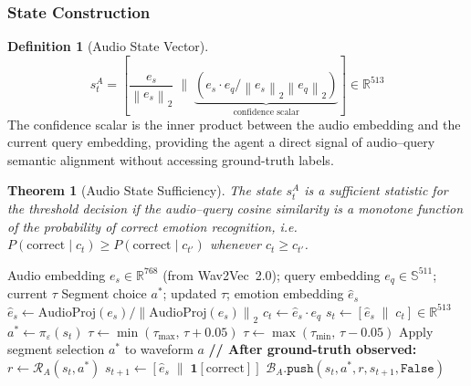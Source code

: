 \documentclass[12pt,a4paper]{article}
\theoremstyle{definition}
\newtheorem{definition}{Definition}[section]
\theoremstyle{plain}
\newtheorem{theorem}{Theorem}[section]
\theoremstyle{remark}
\newcommand{\R}{\mathbb{R}}
\newcommand{\Sph}{\mathbb{S}}
\newcommand{\Norm}[1]{\left\|#1\right\|_2}
\begin{document}
\subsubsection{State Construction}

\begin{definition}[Audio State Vector]
\[
  s_t^A = \left[\frac{e_s}{\Norm{e_s}}\;\Bigg\|\;
  \underbrace{(e_s \cdot e_q / \Norm{e_s}\Norm{e_q})}_{\text{confidence scalar}}\right]
  \in \R^{513}
\]
The confidence scalar is the inner product between the audio embedding and the
current query embedding, providing the agent a direct signal of audio--query
semantic alignment without accessing ground-truth labels.
\end{definition}

\begin{theorem}[Audio State Sufficiency]
\label{thm:audio_state}
The state $s_t^A$ is a sufficient statistic for the threshold decision if the
audio--query cosine similarity is a monotone function of the probability of
correct emotion recognition, i.e.\ $P(\text{correct} \mid c_t) \ge
P(\text{correct} \mid c_{t'})$ whenever $c_t \ge c_{t'}$.
\end{theorem}

\begin{algorithm}[H]
\caption{RL-Audio Policy --- Inference and Feedback}
\label{alg:rl_audio}
\begin{algorithmic}[1]
\Require Audio embedding $e_s\in\R^{768}$ (from Wav2Vec~2.0);
         query embedding $e_q\in\Sph^{511}$; current $\tau$
\Ensure Segment choice $a^*$; updated $\tau$; emotion embedding $\hat{e}_s$
\State $\hat{e}_s \gets \mathrm{AudioProj}(e_s)/\Norm{\mathrm{AudioProj}(e_s)}$
\State $c_t \gets \hat{e}_s \cdot e_q$
\State $s_t \gets [\hat{e}_s \;\|\; c_t] \in \R^{513}$
\State $a^* \gets \pi_{\varepsilon}(s_t)$
  $\tau \gets \min(\tau_{\max},\,\tau + 0.05)$
  $\tau \gets \max(\tau_{\min},\,\tau - 0.05)$
\EndIf
\State Apply segment selection $a^*$ to waveform $a$
\State \textbf{// After ground-truth observed:}
\State $r \gets \mathcal{R}_A(s_t, a^*)$
\State $s_{t+1} \gets [\hat{e}_s \;\|\; \mathbf{1}[\text{correct}]]$
\State $\mathcal{B}_A.\texttt{push}(s_t,a^*,r,s_{t+1},\texttt{False})$
\State {}
\end{algorithmic}
\end{algorithm}
\end{document}
